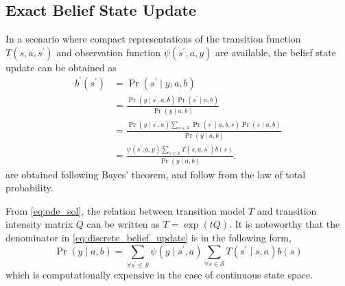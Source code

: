 \subsection{Exact Belief State Update}
\label{sec:exact_update}
In a scenario where compact representations of the transition function $ T(s, a, s^{\prime})$  and observation function $ \psi(s^{\prime}, a, y) $ are available, the belief state update can be obtained as \cite{KAELBLING199899}
\begin{align}
b^{\prime}\left(s^{\prime}\right) &=\operatorname{Pr}\left(s^{\prime} \mid y, a, b\right) \label{eq:bu1}\\
&=\frac{\operatorname{Pr}\left(y \mid s^{\prime}, a, b\right) \operatorname{Pr}\left(s^{\prime} \mid a, b\right)}{\operatorname{Pr}(y \mid a, b)} \label{eq:bu2}\\
&=\frac{\operatorname{Pr}\left(y \mid s^{\prime}, a\right) \sum_{s \in \mathcal{S}} \operatorname{Pr}\left(s^{\prime} \mid a, b, s\right) \operatorname{Pr}(s \mid a, b)}{\operatorname{Pr}(y \mid a, b)}  \label{eq:bu3}\\
&=\frac{\psi\left(s^{\prime}, a, y\right) \sum_{s \in \mathcal{S}} T\left(s,a, s^{\prime}\right) b(s)}{\operatorname{Pr}(y \mid a, b)}.
\label{eq:discrete_belief_update}
\end{align}
 are obtained following Bayes' theorem, and  follow from the law of total probability. \par
From \autoref{eq:ode_sol}, the relation between transition model $ T $ and transition intensity matrix $ Q $ can be written as $ T = \exp(tQ) $.
It is noteworthy that the denominator in \autoref{eq:discrete_belief_update} is in the following form, 
\begin{equation}
\operatorname{Pr}(y \mid a, b) = \sum_{\forall s^{\prime} \in \mathcal{S}} \psi(y \mid s^{\prime}, a) \sum_{\forall s \in \mathcal{S}} T(s^{\prime}\mid s,a) b(s)
\label{eq:nasty_denom}
\end{equation}
which is computationally expensive in the case of continuous state space.
